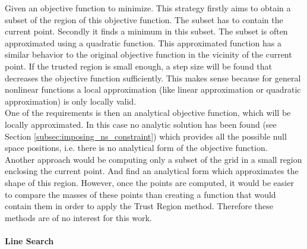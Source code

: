 Given an objective function to minimize. This  strategy firstly aims to obtain a subset of the region of this objective function. The subset has to contain the current point. Secondly it finds a minimum in this subset. The subset is often approximated using a quadratic function. This approximated function has a similar behavior to the original objective function in the vicinity of the current point. If the trusted region is small enough, a step size will be found that decreases the objective function sufficiently. This makes sense because for general nonlinear functions a local approximation (like linear approximation or quadratic approximation)  is only locally valid. \\ 
%
One of the requirements is then an analytical objective function, which will be locally approximated. In this case no analytic solution has been found (see Section \ref{subsec:imposing_ns_constraint}) which  provides all the possible null space positions, i.e. there is no analytical form of the objective function.\\
%
%
Another approach would be computing only a subset of the grid in a small region enclosing the current point. And find an analytical form which approximates the shape of this region. However, once the points are computed, it would be easier to compare the masses of these points than creating a function that would contain them in order to apply the Trust Region method. Therefore these methods are of no interest for this work.





\paragraph{Line Search}
\label{subsec:lsearch}




